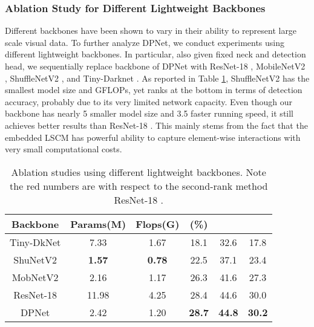 \documentclass[lettersize,journal]{IEEEtran}
\begin{document}
\subsubsection{Ablation Study for Different Lightweight Backbones}
Different backbones have been shown to vary in their ability to represent large scale visual data. To further analyze DPNet, we conduct experiments using different lightweight backbones. In particular, also given fixed neck and detection head, we sequentially replace backbone of DPNet with ResNet-18 \cite{resnet}, MobileNetV2 \cite{sandler2018mobilenetv2}, ShuffleNetV2 \cite{ma2018shufflenet}, and Tiny-Darknet \cite{redmon2018yolov3}. As reported in Table \ref{tab:backbone}, ShuffleNetV2 \cite{ma2018shufflenet} has the smallest model size and GFLOPs, yet ranks at the bottom in terms of detection accuracy, probably due to its very limited network capacity. Even though our backbone has nearly 5 smaller model size and 3.5 faster running speed, it still achieves better results than ResNet-18 \cite{resnet}. This mainly stems from the fact that the embedded LSCM has powerful ability to capture element-wise interactions with very small computational costs.

\begin{table}[t!] 
	\tabcolsep 0.3mm \caption{Ablation studies using different lightweight backbones. Note the red numbers are with respect to the second-rank method ResNet-18 \cite{resnet}.}
	\begin{center}
		\begin{tabular}{c|c|c|c|c|c}
			\toprule \multirow{1}{*}{Backbone} &\multirow{1}{*}{Params(M)}  & \multirow{1}{*}{Flops(G)}& \multirow{1}{*}{(\%)}& \multirow{1}{*}{}& \multirow{1}{*}{}\\ \midrule			
			Tiny-DkNet \cite{redmon2018yolov3} &7.33 &1.67 &18.1 &32.6 &17.8   \\		
			ShuNetV2 \cite{ma2018shufflenet} &\textbf{1.57} &\textbf{0.78} &22.5 &37.1 &23.4 \\
			MobNetV2 \cite{sandler2018mobilenetv2} &2.16 &1.17 &26.3 &41.6 &27.3 \\
			ResNet-18 \cite{resnet} &11.98 &4.25 &28.4 &44.6 &30.0 \\
\midrule
			DPNet  &2.42 &1.20 &\textbf{28.7} &\textbf{44.8} &\textbf{30.2}\\
\bottomrule
		\end{tabular}
	\end{center}\label{tab:backbone}
\end{table}
\end{document}
